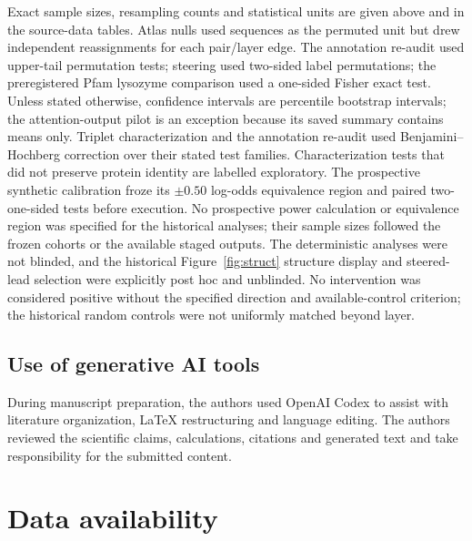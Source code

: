 \documentclass[pdflatex,sn-nature]{sn-jnl}
\begin{document}
Exact sample sizes, resampling counts and statistical units are given above and in the source-data tables. Atlas nulls used sequences as the permuted unit but drew independent reassignments for each pair/layer edge. The annotation re-audit used upper-tail permutation tests; steering used two-sided label permutations; the preregistered Pfam lysozyme comparison used a one-sided Fisher exact test. Unless stated otherwise, confidence intervals are percentile bootstrap intervals; the attention-output pilot is an exception because its saved summary contains means only. Triplet characterization and the annotation re-audit used Benjamini--Hochberg correction over their stated test families. Characterization tests that did not preserve protein identity are labelled exploratory. The prospective synthetic calibration froze its $\pm0.50$ log-odds equivalence region and paired two-one-sided tests before execution. No prospective power calculation or equivalence region was specified for the historical analyses; their sample sizes followed the frozen cohorts or the available staged outputs. The deterministic analyses were not blinded, and the historical Figure~\ref{fig:struct} structure display and steered-lead selection were explicitly post hoc and unblinded. No intervention was considered positive without the specified direction and available-control criterion; the historical random controls were not uniformly matched beyond layer.

\subsection{Use of generative AI tools}

During manuscript preparation, the authors used OpenAI Codex to assist with literature organization, LaTeX restructuring and language editing. The authors reviewed the scientific claims, calculations, citations and generated text and take responsibility for the submitted content.

\section*{Data availability}
\end{document}

